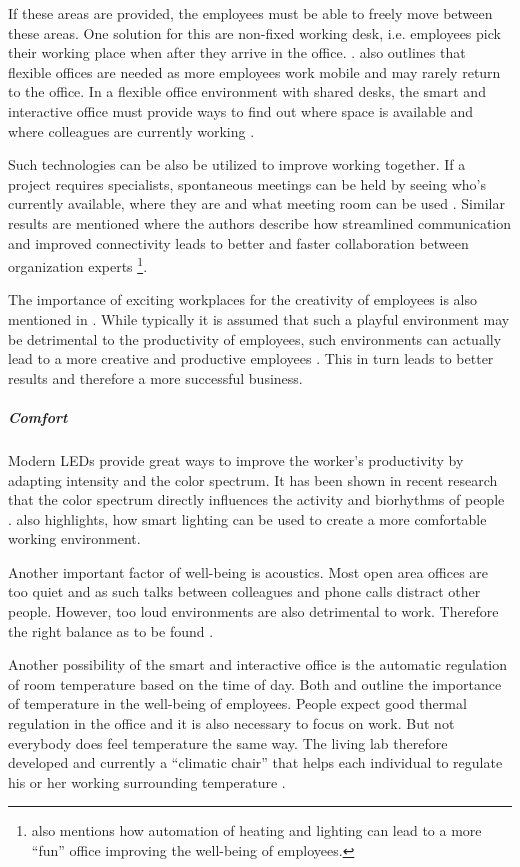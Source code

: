 If these areas are provided, the employees must be able to freely move between these areas. One 
solution for this are non-fixed working desk, i.e. employees pick their working place when after 
they arrive in the office. \cite{occupiee}.  also outlines that flexible offices are needed as more 
employees work mobile and may rarely return to the office. In a flexible office environment with 
shared desks, the smart and interactive office must provide ways to find out where space is 
available and where colleagues are currently working \cite{tieto}.

Such technologies can be also be utilized to improve working together. If a project requires 
specialists, spontaneous meetings can be held by seeing who's currently available, where they are 
and what meeting room can be used \cite{tieto}. Similar results are mentioned \cite{hbcommunications} 
where the authors describe how streamlined communication and improved connectivity leads to better 
and faster collaboration between organization experts \footnote{\cite{hbcommunications} also 
mentions how automation of heating and lighting can lead to a more ``fun'' office improving the 
well-being of employees.}.

The importance of exciting workplaces for the creativity of employees is also mentioned in 
\cite{roomzilla3}. While typically it is assumed that such a playful environment may be detrimental 
to the productivity of employees, such environments can actually lead to a more creative and 
productive employees \cite{metroffice}. This in turn leads to better results and therefore a more 
successful business.



\subparagraph{Comfort}\label{sec:sda-comfort}
Modern LEDs provide great ways to improve the worker's productivity by adapting intensity and the 
color spectrum. It has been shown in recent research that the color spectrum directly influences the 
activity and biorhythms of people  \cite{living-lab}. \cite{iotagenda} also highlights, how smart 
lighting can be used to create a more comfortable working environment.

Another important factor of well-being is acoustics. Most open area offices are too quiet and as 
such talks between colleagues and phone calls distract other people. However, too loud environments 
are also detrimental to work. Therefore the right balance as to be found \cite{living-lab}. 

Another possibility of the smart and interactive office is the automatic regulation of room 
temperature based on the time of day. Both \cite{iotagenda} and \cite{living-lab} outline the 
importance of temperature in the well-being of employees. People expect good thermal regulation in 
the office and it is also necessary to focus on work. But not everybody does feel temperature the 
same way. The living lab therefore developed and currently a ``climatic chair'' that helps each 
individual to regulate his or her working surrounding temperature \cite{living-lab}.


